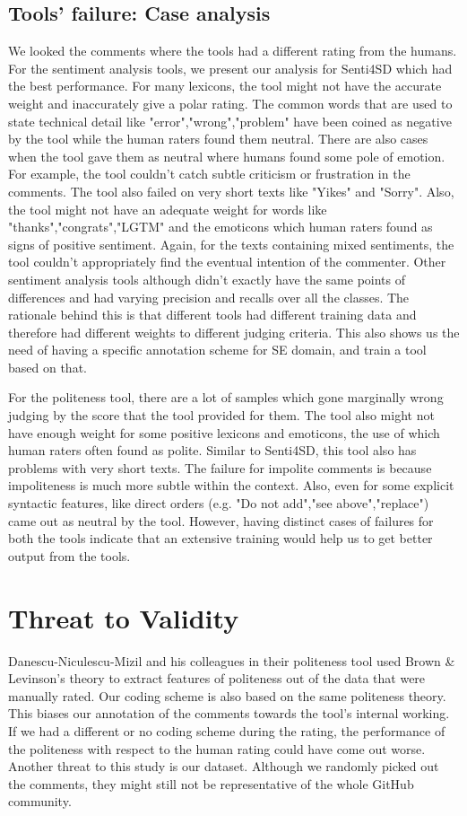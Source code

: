 \subsection{Tools' failure: Case analysis}
We looked the comments where the tools had a different rating from the humans.  For the sentiment analysis tools, we present our analysis for Senti4SD which had the best performance. For many lexicons, the tool might not have the accurate weight and inaccurately give a polar rating. The common words that are used to state technical detail like "error","wrong","problem" have been coined as negative by the tool while the human raters found them neutral. There are also cases when the tool gave them as neutral where humans found some pole of emotion. For example, the tool couldn't catch subtle criticism or frustration in the comments. The tool also failed on very short texts like "Yikes" and "Sorry". Also, the tool might not have an adequate weight for words like "thanks","congrats","LGTM" and the emoticons which human raters found as signs of positive sentiment. Again, for the texts containing mixed sentiments, the tool couldn't appropriately find the eventual intention of the commenter. Other sentiment analysis tools although didn't exactly have the same points of differences and had varying precision and recalls over all the classes. The rationale behind this is that different tools had different training data and therefore had different weights to different judging criteria. This also shows us the need of having a specific annotation scheme for SE domain, and train a tool based on that.

For the politeness tool, there are a lot of samples which gone marginally wrong judging by the score that the tool provided for them. The tool also might not have enough weight for some positive lexicons and emoticons, the use of which human raters often found as polite. Similar to Senti4SD, this tool also has problems with very short texts. The failure for impolite comments is because impoliteness is much more subtle within the context. Also, even for some explicit syntactic features, like direct orders (e.g. "Do not add","see above","replace") came out as neutral by the tool. However, having distinct cases of failures for both the tools indicate that an extensive training would help us to get better output from the tools.

\section{Threat to Validity}
Danescu-Niculescu-Mizil and his colleagues in their politeness tool used Brown \& Levinson's theory to extract features of politeness out of the data that were manually rated. Our coding scheme is also based on the same politeness theory. This biases our annotation of the comments towards the tool's internal working. If we had a different or no coding scheme during the rating, the performance of the politeness with respect to the human rating could have come out worse. Another threat to this study is our dataset. Although we randomly picked out the comments, they might still not be representative of the whole GitHub community.  

